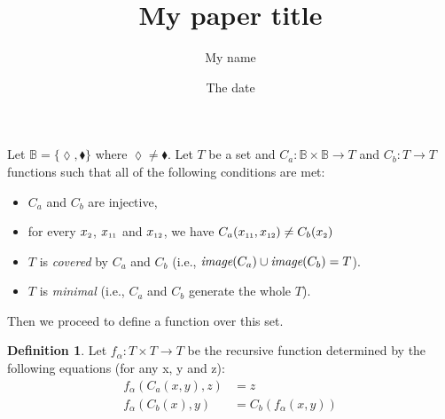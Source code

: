 \documentclass{article}
\title{My paper title}
\author{My name}
\date{The date}
\theoremstyle{definition}
\newtheorem{definition}{Definition}
\begin{document}
\maketitle

Let $\mathbb{B} = \{\lozenge, \blacklozenge \}$ where $\lozenge \neq \blacklozenge$. Let $T$ be a set and $C_{a} : \mathbb{B} \times 
                                                 \mathbb{B} \to T$ and $C_{b} : T \to T$ functions such that all of the following conditions are met: 
\begin{itemize}
\item $C_{a}$ and $C_{b}$ are injective, 
\item for every $x_{\mbox{\tiny 2}}$, $x_{\mbox{\tiny 11}}$ and $x_{\mbox{\tiny 12}}$, we have $C_{a}(x_{\mbox{\tiny 11}}, x_{\mbox{\tiny 12}}) \neq C_{b}(x_{\mbox{\tiny 2}})$
\item $T$  is \textit{covered} by $C_{a}$ and $C_{b}$ (i.e., $\mbox{\it image}(C_{a})\cup\mbox{\it image}(C_{b}) =T$).
\item $T$  is \textit{minimal} (i.e., $C_{a}$ and $C_{b}$ generate the whole $T$).
\end{itemize}

\noindent Then we proceed to define a function over this set.

\begin{definition}
Let $f_{\alpha} : T \times  T \to T$ be the recursive function determined by the following equations (for any x, y and z): 
\begin{align}
f_{\alpha}(C_{a}(x, y), z) &= z \label{f_1.simps_1}\\
f_{\alpha}(C_{b}(x), y) &= C_{b}(f_{\alpha}(x, y)) \label{f_1.simps_2}
\end{align}
\end{definition}
\end{document}

